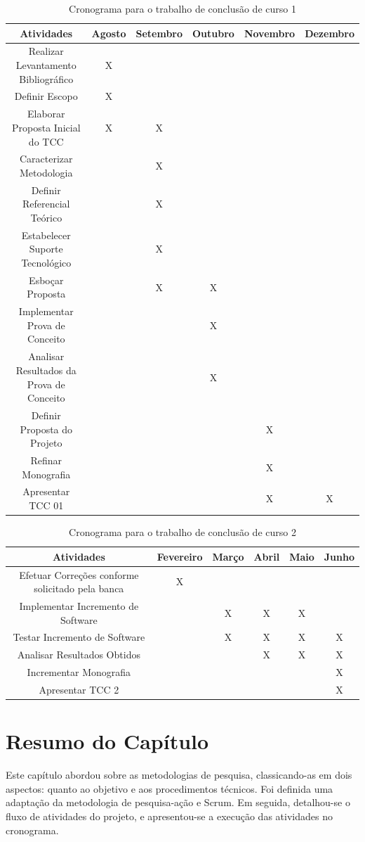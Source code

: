 \begin{table}[h]
  \tiny
  \centering
  \caption{Cronograma para o trabalho de conclusão de curso 1}
  \label{cronograma-tcc-1}
  \begin{tabular}{@{}cccccc@{}}
    \toprule
    Atividades & Agosto & Setembro & Outubro & Novembro & Dezembro \\ \toprule
    Realizar Levantamento Bibliográfico & X &  &  &  &  \\
    Definir Escopo & X &  &  &  &  \\
    Elaborar Proposta Inicial do TCC & X & X &  &  &  \\
    Caracterizar Metodologia &  & X &  &  &  \\
    Definir Referencial Teórico &  & X &  &  &  \\
    Estabelecer Suporte Tecnológico &  & X &  &  &  \\
    Esboçar Proposta &  & X & X &  &  \\
    Implementar Prova de Conceito &  &  & X &  &  \\
    Analisar Resultados da Prova de Conceito &  &  & X &  &  \\
    Definir Proposta do Projeto &  &  &  & X &  \\
    Refinar Monografia &  &  &  & X &  \\
    Apresentar TCC 01 &  &  &  & X & X \\ \hline
  \end{tabular}
\end{table}
\FloatBarrier
  
\begin{table}[h]
  \tiny
  \centering
  \caption{Cronograma para o trabalho de conclusão de curso 2}
  \label{cronograma-tcc-2}
  \begin{tabular}{@{}cccccc@{}}
  \toprule
    Atividades & Fevereiro & Março & Abril & Maio & Junho \\ \toprule
    Efetuar Correções conforme solicitado pela banca & X &  &  &  &  \\
    Implementar Incremento de Software &  & X & X & X &  \\
    Testar Incremento de Software &  & X & X & X & X \\
    Analisar Resultados Obtidos &  &  & X & X & X \\
    Incrementar Monografia &  &  &  &  & X \\
    Apresentar TCC 2 &  &  &  &  & X \\ \hline
  \end{tabular}
\end{table}
\FloatBarrier
  
  \section{Resumo do Capítulo}
  Este capítulo abordou sobre as metodologias de pesquisa, classicando-as em dois aspectos: quanto ao objetivo e aos procedimentos técnicos. Foi definida uma adaptação da metodologia de pesquisa-ação e Scrum. Em seguida, detalhou-se o fluxo de atividades do projeto, e apresentou-se a execução das atividades no cronograma.
